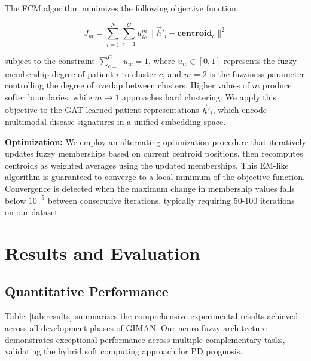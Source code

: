 \documentclass[conference]{IEEEtran}
\begin{document}
The FCM algorithm minimizes the following objective function:

\begin{equation}
J_m = \sum_{i=1}^{N} \sum_{c=1}^{C} u_{ic}^m \|\vec{h}'_i - \mathbf{centroid}_c\|^2
\end{equation}

subject to the constraint $\sum_{c=1}^C u_{ic} = 1$, where $u_{ic} \in [0,1]$ represents the fuzzy membership degree of patient $i$ to cluster $c$, and $m=2$ is the fuzziness parameter controlling the degree of overlap between clusters. Higher values of $m$ produce softer boundaries, while $m \to 1$ approaches hard clustering. We apply this objective to the GAT-learned patient representations $\vec{h}'_i$, which encode multimodal disease signatures in a unified embedding space.

\textbf{Optimization:} We employ an alternating optimization procedure that iteratively updates fuzzy memberships based on current centroid positions, then recomputes centroids as weighted averages using the updated memberships. This EM-like algorithm is guaranteed to converge to a local minimum of the objective function. Convergence is detected when the maximum change in membership values falls below $10^{-5}$ between consecutive iterations, typically requiring 50-100 iterations on our dataset.
\section{Results and Evaluation}
\label{sec:results}

\subsection{Quantitative Performance}

Table~\ref{tab:results} summarizes the comprehensive experimental results achieved across all development phases of GIMAN. Our neuro-fuzzy architecture demonstrates exceptional performance across multiple complementary tasks, validating the hybrid soft computing approach for PD prognosis.
\end{document}
